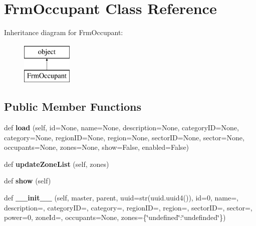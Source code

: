 \hypertarget{class_f_occupant_1_1_frm_occupant}{}\section{Frm\+Occupant Class Reference}
\label{class_f_occupant_1_1_frm_occupant}
Inheritance diagram for Frm\+Occupant\+:\begin{figure}[H]
\begin{center}
\leavevmode
\includegraphics[height=2.000000cm]{class_f_occupant_1_1_frm_occupant}
\end{center}
\end{figure}
\subsection*{Public Member Functions}
\begin{DoxyCompactItemize}
\item 
\mbox{\label{class_f_occupant_1_1_frm_occupant_a77f9e90492436b634a669b1c9736c385}} 
def {\bfseries load} (self, id=None, name=None, description=None, category\+ID=None, category=None, region\+ID=None, region=None, sector\+ID=None, sector=None, occupants=None, zones=None, show=False, enabled=False)
\item 
\mbox{\label{class_f_occupant_1_1_frm_occupant_afce1a505a79b9242ea0063c7be848e01}} 
def {\bfseries update\+Zone\+List} (self, zones)
\item 
\mbox{\label{class_f_occupant_1_1_frm_occupant_ab4f4398c3f210fe4ea6e720401357691}} 
def {\bfseries show} (self)
\item 
\mbox{\label{class_f_occupant_1_1_frm_occupant_af9ea366b42c0f2b7b33d109814e3cfa1}} 
def {\bfseries \+\_\+\+\_\+init\+\_\+\+\_\+} (self, master, parent, uuid=str(uuid.\+uuid4()), id=0, name=\textquotesingle{}\textquotesingle{}, description=\textquotesingle{}\textquotesingle{}, category\+ID=\textquotesingle{}\textquotesingle{}, category=\textquotesingle{}\textquotesingle{}, region\+ID=\textquotesingle{}\textquotesingle{}, region=\textquotesingle{}\textquotesingle{}, sector\+ID=\textquotesingle{}\textquotesingle{}, sector=\textquotesingle{}\textquotesingle{}, power=0, zone\+Id=\textquotesingle{}\textquotesingle{}, occupants=None, zones=\{\char`\"{}undefined\char`\"{}\+:\char`\"{}undefinded\char`\"{}\})
\end{DoxyCompactItemize}
